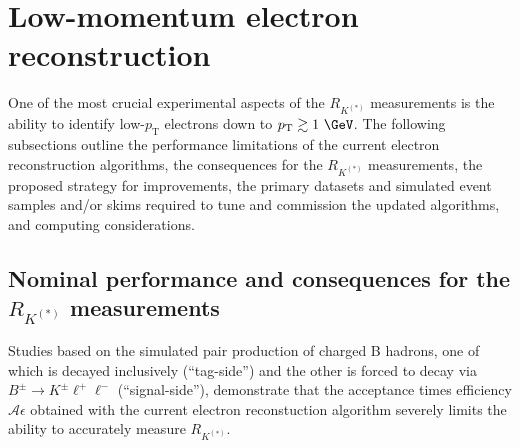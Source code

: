 
\newcommand{\KSll}{B^0\to K^* \ell^+\ell^-}
\newcommand{\KSmm}{B^0\to K^* \mu^+\mu^-}
\newcommand{\KSee}{B^0\to K^* e^+e^-}
\newcommand{\Kll}{B^{\pm}\to K^{\pm} \ell^+\ell^-}
\newcommand{\Kmm}{B^{\pm}\to K^{\pm} \mu^+\mu^-}
\newcommand{\Kee}{B^{\pm}\to K^{\pm} e^+e^-}
\newcommand{\pt}{p_\mathrm{T}}
\newcommand{\acc}{\mathcal{A}}
\newcommand{\eff}{\epsilon}
\newcommand{\ate}{\acc\eff}
\newcommand{\jpsi}{\mathrm{J/}\psi}
\newcommand{\jpsill}{\jpsi\to\ell\ell}
\newcommand{\jpsiee}{\jpsi\to\mathrm{ee}}
\newcommand{\jpsimm}{\jpsi\to\mu\mu}
\newcommand{\zmm}{\mathrm{Z}\to\mu\mu}
\newcommand{\TeV}{\rm{TeV}}
\newcommand{\conv}{\gamma\to\mathrm{ee}}
\newcommand{\bincl}{B_\mathrm{tag}\to\mu_\mathrm{tag}\mathrm{X}}
\newcommand{\bsig}{B_\mathrm{sig}{\to}K^{(*)}\ell\ell}
\newcommand{\bksig}{B^{\pm}_\mathrm{sig}{\to}K^{\pm}\ell\ell}
\newcommand{\bkstsig}{B^{0}_\mathrm{sig}{\to}K^{*0}\ell\ell}

\section{Low-momentum electron reconstruction}
\label{electron}

One of the most crucial experimental aspects of the $R_{K^{(*)}}$
measurements is the ability to identify low-$\pt$ electrons down to
$\pt \gtrsim 1~\GeV$. The following subsections outline the
performance limitations of the current electron reconstruction
algorithms, the consequences for the $R_{K^{(*)}}$ measurements, the
proposed strategy for improvements, the primary datasets and simulated
event samples and/or skims required to tune and commission the updated
algorithms, and computing considerations.


\subsection{Nominal performance and consequences for the
  \texorpdfstring{$R_{K^{(*)}}$}{RK} measurements} 

Studies based on the simulated pair production of charged B hadrons,
one of which is decayed inclusively (``tag-side'') and the other is
forced to decay via $\Kll$ (``signal-side''), demonstrate that the
acceptance times efficiency $\ate$ obtained with the current electron
reconstuction algorithm severely limits the ability to accurately
measure $R_{K^{(*)}}$.

